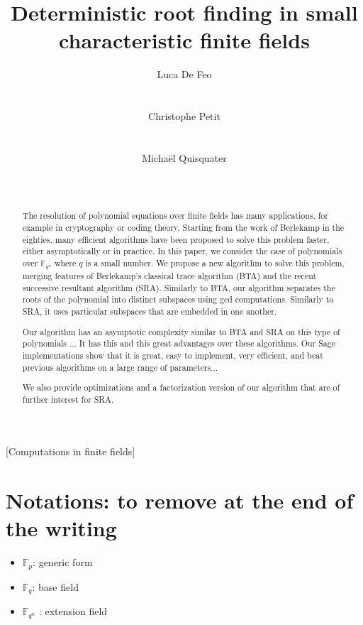 \documentclass{sig-alternate}
\author{
  \alignauthor Luca De Feo\\
  \affaddr{Laboratoire PRiSM}\\
  \affaddr{Universit\'e de Versailles}\\
  \email{luca.de-feo@uvsq.fr}
  \alignauthor Christophe Petit\\
  \affaddr{Crypto Group}\\
  \affaddr{University College London}\\
  \email{}
  \alignauthor Micha\"el Quisquater\\
  \affaddr{Laboratoire PRiSM}\\
  \affaddr{Universit\'e de Versailles}\\
  \email{mquis@prism.uvsq.fr}
}
\title{Deterministic root finding in small characteristic finite
  fields}
\newcommand{\ff}[1]{\mathbb{F}_{#1}}
\newcommand{\fq}{\ff{q}}
\newcommand{\fqn}{\ff{q^n}}
\newcommand{\qq}{q}
\newcounter{algo}
\begin{document}
\maketitle
\begin{abstract}
  The resolution of polynomial equations over finite fields has many
  applications, for example in cryptography or coding theory. Starting
  from the work of Berlekamp in the eighties, many efficient
  algorithms have been proposed to solve this problem faster, either
  asymptotically or in practice.  In this paper, we consider the case
  of polynomials over $\fqn$ where $\qq$ is a small number. We propose a
  new algorithm to solve this problem, merging features of Berlekamp's
  classical trace algorithm (BTA) and the recent successive resultant
  algorithm (SRA).  Similarly to BTA, our algorithm separates the
  roots of the polynomial into distinct subspaces using gcd
  computations. Similarly to SRA, it uses particular subspaces that
  are embedded in one another.

  Our algorithm has an asymptotic complexity similar to BTA and SRA on
  this type of polynomials ... It has this and this great advantages
  over these algorithms. Our Sage implementations show that it is
  great, easy to implement, very efficient, and beat previous
  algorithms on a large range of parameters...

  We also provide optimizations and a factorization version of our
  algorithm that are of further interest for SRA.
\end{abstract}

[Computations in finite fields]



\section*{Notations: to remove at the end of the writing}


\begin{itemize}
\item $\ff{p}$: generic form
\item $\fq$: base field 
\item  $\fqn$ : extension field  
\end{itemize}
\end{document}
